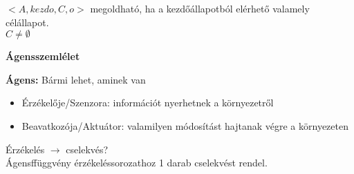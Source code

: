\documentclass[a4paper, 12pt, fullpage]{article}
\begin{document}
    $<A, kezdo, C, o>$ megoldható, ha a kezdőállapotból elérhető valamely célállapot.\\
    $C \neq \emptyset$\\
    \begin{center}
        \textbf{Ágensszemlélet}
    \end{center}
    \textbf{Ágens:} Bármi lehet, aminek van \begin{itemize}
        \item Érzékelője/Szenzora: információt nyerhetnek a környezetről
        \item Beavatkozója/Aktuátor: valamilyen módosítást hajtanak végre a környezeten
    \end{itemize}
    Érzékelés $\longrightarrow$ cselekvés?\\
    Ágensffüggvény érzékeléssorozathoz 1 darab cselekvést rendel.
\end{document}
